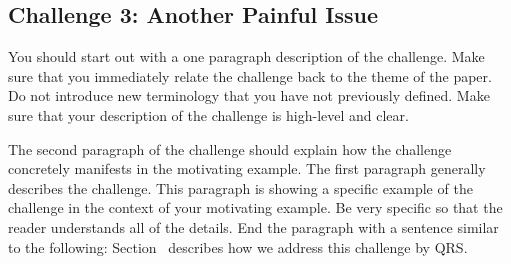 \subsection{Challenge 3: Another Painful Issue}
\label{challenge3}

You should start out with a one paragraph description of
the challenge. Make sure that you immediately relate the
challenge back to the theme of the paper. Do not introduce
new terminology that you have not previously defined. Make
sure that your description of the challenge is high-level
and clear.

The second paragraph of the challenge should explain how
the challenge concretely manifests in the motivating example.
The first paragraph generally describes the challenge. This
paragraph is showing a specific example of the challenge in
the context of your motivating example. Be very specific
so that the reader understands all of the details. End
the paragraph with a sentence similar to the following:
Section~ describes how we address this
challenge by QRS.
